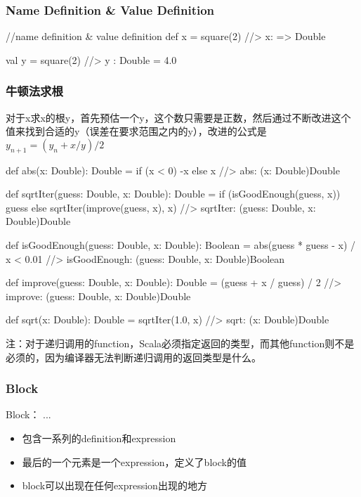\subsubsection{Name Definition \& Value Definition}
\begin{Scala}[名字和值的不同]
  //name definition & value definition
  def x = square(2)                               //> x: => Double

  val y = square(2)                               //> y  : Double = 4.0
\end{Scala}

\subsubsection{牛顿法求根}
对于x求x的根y，首先预估一个y，这个数只需要是正数，然后通过不断改进这个值来找到合适的y（误差在要求范围之内的y），改进的公式是$y_{n+1} = (y_n + x/y)/2$
\begin{Scala}[没太弄懂为什么需要除以x来解决问题]
  def abs(x: Double): Double = if (x < 0) -x else x
                                                  //> abs: (x: Double)Double

  def sqrtIter(guess: Double, x: Double): Double =
    if (isGoodEnough(guess, x)) guess
    else sqrtIter(improve(guess, x), x)           //> sqrtIter: (guess: Double, x: Double)Double

  def isGoodEnough(guess: Double, x: Double): Boolean =
    abs(guess * guess - x) / x < 0.01             //> isGoodEnough: (guess: Double, x: Double)Boolean

  def improve(guess: Double, x: Double): Double =
    (guess + x / guess) / 2                       //> improve: (guess: Double, x: Double)Double

  def sqrt(x: Double): Double = sqrtIter(1.0, x)  //> sqrt: (x: Double)Double
\end{Scala}
注：对于递归调用的function，Scala必须指定返回的类型，而其他function则不是必须的，因为编译器无法判断递归调用的返回类型是什么。

\subsubsection{Block}
Block： {...}
\begin{itemize}
\item 包含一系列的definition和expression
\item 最后的一个元素是一个expression，定义了block的值
\item block可以出现在任何expression出现的地方
\end{itemize}

